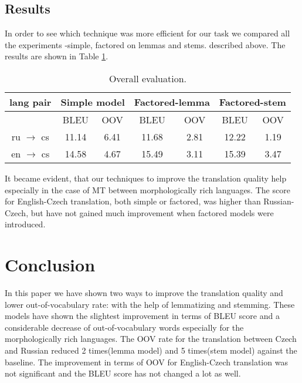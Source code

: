 \documentclass[11pt,letterpaper]{article}
\begin{document}
\subsection{Results}

In order to see which technique was more efficient for our 
task we compared all the experiments -simple, factored on lemmas and stems. 
described above. The results are shown in Table \ref{tab:overall}.
\begin{table}
\begin{center}
\begin{tabular} {ccccccc}
\hline
lang pair &\multicolumn{2}{c}{Simple model} & \multicolumn{2}{c}{Factored-lemma} & \multicolumn{2}{c}{Factored-stem}\\ \hline
                       & BLEU   &OOV    & BLEU   & OOV & BLEU  & OOV \\ \hline
ru $\rightarrow$ cs    & 11.14  &6.41   &11.68   &2.81 & 12.22 &1.19 \\ %
en $\rightarrow$ cs    & 14.58  &4.67   &15.49   &3.11 & 15.39  &3.47  \\ \hline %
\end{tabular}
\end{center}
\caption{Overall evaluation.}
\label{tab:overall}
\end{table}

It became evident, that our techniques to improve the translation quality help especially in the
case of MT between morphologically rich languages. The score for English-Czech translation, both simple
or factored, was higher than Russian-Czech, but have not gained much improvement when 
factored models were introduced. 


\section{Conclusion}
In this paper we have shown two ways to improve the translation quality and lower out-of-vocabulary rate:
with the help of lemmatizing and stemming. These models have shown the slightest improvement in terms of BLEU
score and a considerable decrease of out-of-vocabulary words especially for the morphologically rich languages. 
The OOV rate for the translation between Czech and Russian reduced 2 times(lemma model) and 5 times(stem model) 
against the baseline. The improvement in terms of OOV for English-Czech translation was not
significant and the BLEU score has not changed a lot as well.
\end{document}

